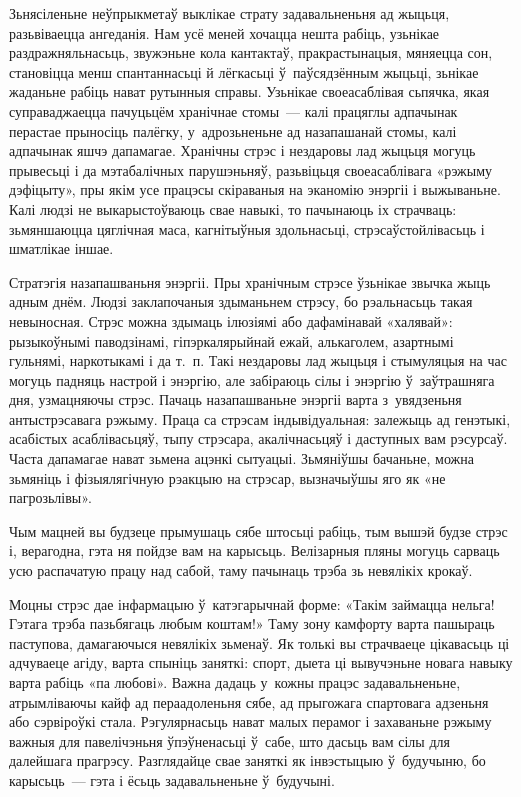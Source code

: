 Зьнясіленьне неўпрыкметаў выклікае страту задавальненьня ад жыцьця, разьвіваецца ангеданія. Нам усё меней хочацца нешта рабіць, узьнікае раздражняльнасьць, звужэньне кола кантактаў, пракрастынацыя, мяняецца сон, становіцца менш спантаннасьці й лёгкасьці ў~паўсядзённым жыцьці, зьнікае жаданьне рабіць нават рутынныя справы. Узьнікае своеасаблівая сьпячка, якая суправаджаецца пачуцьцём хранічнае стомы~--- калі працяглы адпачынак перастае прыносіць палёгку, у~адрозьненьне ад назапашанай стомы, калі адпачынак яшчэ дапамагае. Хранічны стрэс і нездаровы лад жыцьця могуць прывесьці і да мэтабалічных парушэньняў, разьвіцьця своеасаблівага «рэжыму дэфіцыту», пры якім усе працэсы скіраваныя на эканомію энэргіі і выжываньне. Калі людзі не выкарыстоўваюць свае навыкі, то пачынаюць іх страчваць: зьмяншаюцца цяглічная маса, кагнітыўныя здольнасьці, стрэсаўстойлівасьць і шматлікае іншае.

Стратэгія назапашваньня энэргіі. Пры хранічным стрэсе ўзьнікае звычка жыць адным днём. Людзі заклапочаныя здыманьнем стрэсу, бо рэальнасьць такая невыносная. Стрэс можна здымаць ілюзіямі або дафамінавай «халявай»: рызыкоўнымі паводзінамі, гіпэркалярыйнай ежай, алькаголем, азартнымі гульнямі, наркотыкамі і да т.~п. Такі нездаровы лад жыцьця і стымуляцыя на час могуць падняць настрой і энэргію, але забіраюць сілы і энэргію ў~заўтрашняга дня, узмацняючы стрэс. Пачаць назапашваньне энэргіі варта з~увядзеньня антыстрэсавага рэжыму. Праца са стрэсам індывідуальная: залежыць ад генэтыкі, асабістых асаблівасьцяў, тыпу стрэсара, акалічнасьцяў і даступных вам рэсурсаў. Часта дапамагае нават зьмена ацэнкі сытуацыі. Зьмяніўшы бачаньне, можна зьмяніць і фізыялягічную рэакцыю на стрэсар, вызначыўшы яго як «не пагрозьлівы».

Чым мацней вы будзеце прымушаць сябе штосьці рабіць, тым вышэй будзе стрэс і, верагодна, гэта ня пойдзе вам на карысьць. Велізарныя пляны могуць сарваць усю распачатую працу над сабой, таму пачынаць трэба зь невялікіх крокаў.

Моцны стрэс дае інфармацыю ў~катэгарычнай форме: «Такім займацца нельга! Гэтага трэба пазьбягаць любым коштам!» Таму зону камфорту варта пашыраць паступова, дамагаючыся невялікіх зьменаў. Як толькі вы страчваеце цікавасьць ці адчуваеце агіду, варта спыніць заняткі: спорт, дыета ці вывучэньне новага навыку варта рабіць «па любові». Важна дадаць у~кожны працэс задавальненьне, атрымліваючы кайф ад пераадоленьня сябе, ад прыгожага спартовага адзеньня або сэрвіроўкі стала. Рэгулярнасьць нават малых перамог і захаваньне рэжыму важныя для павелічэньня ўпэўненасьці ў~сабе, што дасьць вам сілы для далейшага прагрэсу. Разглядайце свае заняткі як інвэстыцыю ў~будучыню, бо карысьць~--- гэта і ёсьць задавальненьне ў~будучыні.

